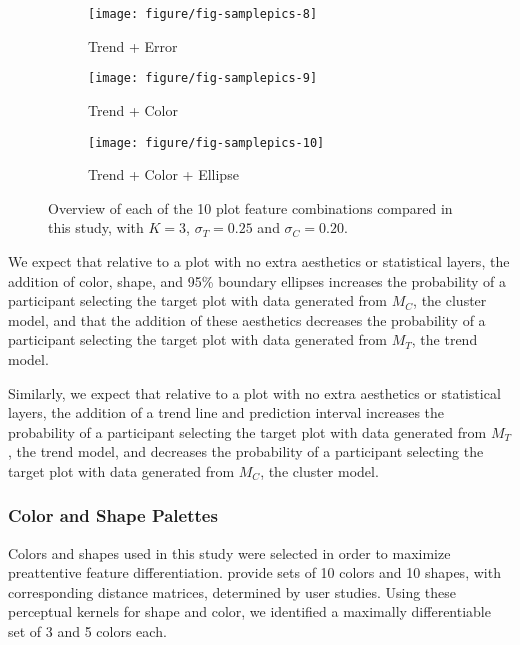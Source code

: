 \documentclass[12pt]{article}\usepackage[]{graphicx}\usepackage[]{color}
\begin{document}
\begin{figure}[ht]
\begin{subfigure}[t]{0.25\linewidth}
\end{subfigure}
\begin{subfigure}[t]{0.25\linewidth}
  \caption{Trend + Error }\vspace{-0.15in}
  \texttt{[image: figure/fig-samplepics-8]}
\end{subfigure}
\begin{subfigure}[t]{0.25\linewidth}
  \caption{Trend + Color}\vspace{-0.15in}
  \texttt{[image: figure/fig-samplepics-9]}
\end{subfigure}
\begin{subfigure}[t]{\linewidth}
\centering
  \caption{Trend + Color + Ellipse}\vspace{-0.15in}
  \texttt{[image: figure/fig-samplepics-10]}
\end{subfigure}
\caption[Sample lineup stimuli for each of the 10 aesthetic combinations]{Overview of each of the 10 plot feature combinations compared in this study, with $K=3$, $\sigma_T=0.25$ and $\sigma_C=0.20$. \label{fig:plotExamples}}
\end{figure}




\afterpage{\clearpage}

We expect that relative to a plot with no extra aesthetics or statistical layers, the addition of color, shape, and 95\% boundary ellipses  increases the probability of a participant selecting the target plot with data generated from $M_C$, the cluster model, and that the addition of these aesthetics  decreases the probability of a participant selecting the target plot with data generated from $M_T$, the trend model. 

Similarly, we expect that relative to a plot with no extra aesthetics or statistical layers, the addition of a trend line and prediction interval  increases the probability of a participant selecting the target plot with data generated from $M_T$, the trend model, and decreases the probability of a participant selecting the target plot with data generated from $M_C$, the cluster model.

\subsubsection{Color and Shape Palettes}
Colors and shapes used in this study were selected in order to maximize preattentive feature differentiation. \citet{heer:2014} provide sets of 10 colors and 10 shapes, with corresponding distance matrices, determined by user studies. Using these perceptual kernels for shape and color, we identified a maximally differentiable set of 3 and 5 colors each.%
\end{document}
